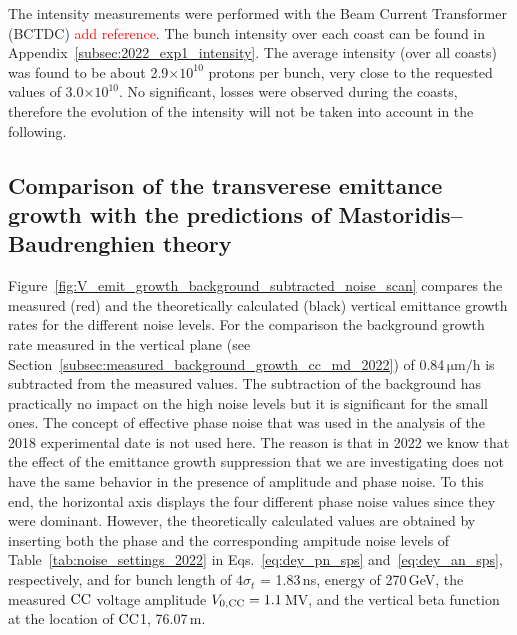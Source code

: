 The intensity measurements were performed with the Beam Current Transformer (BCTDC) \textcolor{red}{add reference}. The bunch intensity over each coast can be found in Appendix~\ref{subsec:2022_exp1_intensity}. The average intensity (over all coasts) was found to be about 2.9$\times 10^{10}$ protons per bunch, very close to the requested values of 3.0$\times 10^{10}$. No significant, losses were observed during the coasts, therefore the evolution of the intensity will not be taken into account in the following.

\subsection{Comparison of the transverese emittance growth with the predictions of Mastoridis--Baudrenghien theory}\label{sec:cc_exp1_2022_theory_vs_measurements}

Figure~\ref{fig:V_emit_growth_background_subtracted_noise_scan} compares the measured (red) and the theoretically calculated (black) vertical emittance growth rates for the different noise levels. For the comparison the background growth rate measured in the vertical plane (see Section~\ref{subsec:measured_background_growth_cc_md_2022}) of 0.84\,$\mathrm{\mu m /h}$ is subtracted from the measured values. The subtraction of the background has practically no impact on the high noise levels but it is significant for the small ones. The concept of effective phase noise that was used in the analysis of the 2018 experimental date is not used here. The reason is that in 2022 we know that the effect of the emittance growth suppression that we are investigating does not have the same behavior in the presence of amplitude and phase noise. To this end, the horizontal axis displays the four different phase noise values since they were dominant. However, the theoretically calculated values are obtained by inserting both the phase and the corresponding ampitude noise levels of Table~\ref{tab:noise_settings_2022} in Eqs.~\eqref{eq:dey_pn_sps} and~\eqref{eq:dey_an_sps}, respectively, and for bunch length of $4 \sigma_t$ = 1.83\,ns, energy of 270\,GeV, the measured ${\mathrm{CC}}$ voltage amplitude ${V_\mathrm{0, CC}}=1.1$\,MV, and the vertical beta function at the location of ${\mathrm{CC}}$1, 76.07\,m.


